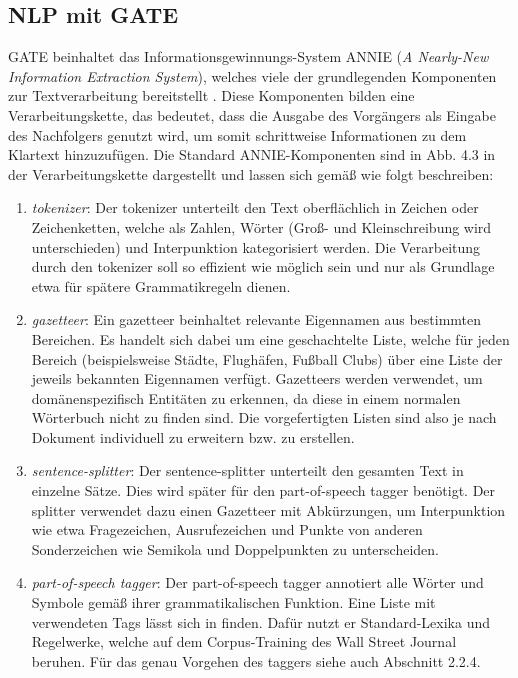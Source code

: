 \documentclass[12pt]{report}
\begin{document}
\subsection{NLP mit GATE}
GATE beinhaltet das Informationsgewinnungs-System ANNIE (\textit{A Nearly-New Information Extraction System}), welches viele der grundlegenden Komponenten zur Textverarbeitung bereitstellt \cite{go18}. Diese Komponenten bilden eine Verarbeitungskette, das bedeutet, dass die Ausgabe des Vorgängers als Eingabe des Nachfolgers genutzt wird, um somit schrittweise Informationen zu dem Klartext hinzuzufügen. Die Standard ANNIE-Komponenten sind in Abb. 4.3 in der Verarbeitungskette dargestellt und lassen sich gemäß \cite{gm18} wie folgt beschreiben:

\begin{enumerate}
\item \textit{tokenizer}: Der tokenizer unterteilt den Text oberflächlich in Zeichen oder Zeichenketten, welche als Zahlen, Wörter (Groß- und Kleinschreibung wird unterschieden) und Interpunktion kategorisiert werden. Die Verarbeitung durch den tokenizer soll so effizient wie möglich sein und nur als Grundlage etwa für spätere Grammatikregeln dienen. 

\item \textit{gazetteer}: Ein gazetteer beinhaltet relevante Eigennamen aus bestimmten Bereichen. Es handelt sich dabei um eine geschachtelte Liste, welche für jeden Bereich (beispielsweise Städte, Flughäfen, Fußball Clubs) über eine Liste der jeweils bekannten Eigennamen verfügt. Gazetteers werden verwendet, um domänenspezifisch Entitäten zu erkennen, da diese in einem normalen Wörterbuch nicht zu finden sind. Die vorgefertigten Listen sind also je nach Dokument individuell zu erweitern bzw. zu erstellen.

\item \textit{sentence-splitter}: Der sentence-splitter unterteilt den gesamten Text in einzelne Sätze. Dies wird später für den part-of-speech tagger benötigt. Der splitter verwendet dazu einen Gazetteer mit Abkürzungen, um Interpunktion wie etwa Fragezeichen, Ausrufezeichen und Punkte von anderen Sonderzeichen wie Semikola und Doppelpunkten zu unterscheiden. 

\item \textit{part-of-speech tagger}: Der part-of-speech tagger annotiert alle Wörter und Symbole gemäß ihrer grammatikalischen Funktion. Eine Liste mit verwendeten Tags lässt sich in \cite{gt18} finden. Dafür nutzt er Standard-Lexika und Regelwerke, welche auf dem Corpus-Training des Wall Street Journal beruhen. Für das genau Vorgehen des taggers siehe auch Abschnitt 2.2.4.


\end{enumerate}
\end{document}
